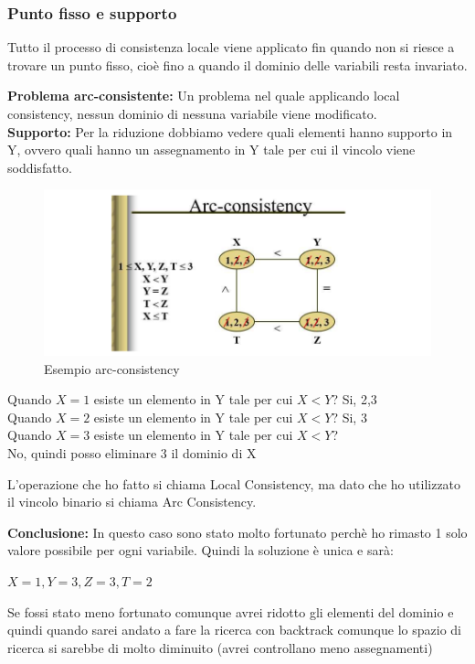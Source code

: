 \subsubsection{Punto fisso e supporto}
Tutto il processo di consistenza locale viene applicato fin quando non si riesce a trovare un punto fisso, cioè fino a quando il dominio delle variabili resta invariato.
\vspace{0.5cm}

 \textbf{Problema arc-consistente:} Un problema nel quale applicando local consistency, nessun dominio di nessuna variabile viene modificato. \\
\noindent \textbf{Supporto:} Per la riduzione dobbiamo vedere quali elementi hanno supporto in Y, ovvero quali hanno un assegnamento in Y tale per cui il vincolo viene soddisfatto.
\begin{figure}[htp]
	\centering
    \includegraphics[width=13cm, keepaspectratio]{img/Cap3/esempio-arc.png}
    \caption{Esempio arc-consistency}
\end{figure}
\begin{center}
    Quando $X=1$ esiste un elemento in Y tale per cui $X < Y$? Si, 2,3
    \\Quando $X=2$ esiste un elemento in Y tale per cui $X < Y$? Si, 3
    \\Quando $X=3$ esiste un elemento in Y tale per cui $X < Y$?
    \\No, quindi posso eliminare 3 il dominio di X    
\end{center}
L’operazione che ho fatto si chiama Local Consistency, ma dato che ho utilizzato il vincolo binario si chiama Arc Consistency.

\noindent \textbf{Conclusione:} In questo caso sono stato molto fortunato perchè ho rimasto 1 solo valore possibile per ogni variabile. Quindi la soluzione è unica e sarà:
\begin{center}
    $X = 1, Y = 3, Z = 3, T = 2$
\end{center}
Se fossi stato meno fortunato comunque avrei ridotto gli elementi del dominio e quindi quando sarei andato a fare la ricerca con backtrack comunque lo spazio di ricerca si sarebbe di molto diminuito (avrei controllano meno assegnamenti)
\vspace{0.3cm}

